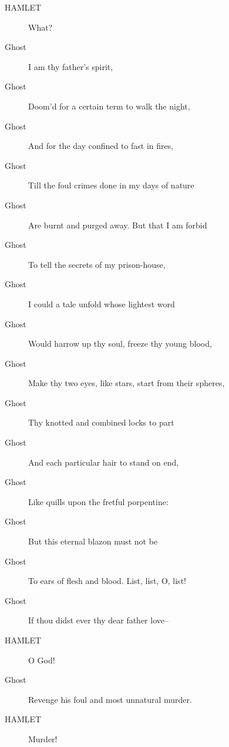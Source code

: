 \documentclass{article}
\begin{document}
\begin{description}
            
\item[HAMLET] What?
\end{description}
          
\begin{description}
            
\item[Ghost] I am thy father's spirit,
\item[Ghost] Doom'd for a certain term to walk the night,
\item[Ghost] And for the day confined to fast in fires,
\item[Ghost] Till the foul crimes done in my days of nature
\item[Ghost] Are burnt and purged away. But that I am forbid
\item[Ghost] To tell the secrets of my prison-house,
\item[Ghost] I could a tale unfold whose lightest word
\item[Ghost] Would harrow up thy soul, freeze thy young blood,
\item[Ghost] Make thy two eyes, like stars, start from their spheres,
\item[Ghost] Thy knotted and combined locks to part
\item[Ghost] And each particular hair to stand on end,
\item[Ghost] Like quills upon the fretful porpentine:
\item[Ghost] But this eternal blazon must not be
\item[Ghost] To ears of flesh and blood. List, list, O, list!
\item[Ghost] If thou didst ever thy dear father love--
\end{description}
          
\begin{description}
            
\item[HAMLET] O God!
\end{description}
          
\begin{description}
            
\item[Ghost] Revenge his foul and most unnatural murder.
\end{description}
          
\begin{description}
            
\item[HAMLET] Murder!
\end{description}
          
\end{document}

